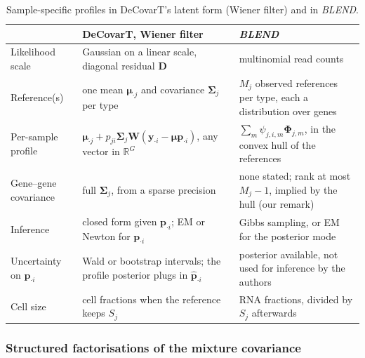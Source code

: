 \begin{table}[ht]
  \centering
  \small
  \caption{Sample-specific profiles in DeCovarT's latent form (Wiener filter) and in \emph{BLEND}.}
  \label{tab:wiener-blend}
  \begin{tabularx}{\textwidth}{@{}lYY@{}}
    \toprule
     & DeCovarT, Wiener filter & \emph{BLEND} \\
    \midrule
    Likelihood scale & Gaussian on a linear scale, diagonal residual \(\boldsymbol{D}\) & multinomial read counts \\
    Reference(s) & one mean \(\boldsymbol{\mu}_{\cdot j}\) and covariance \(\boldsymbol{\Sigma}_{j}\) per type & \(M_{j}\) observed references per type, each a distribution over genes \\
    Per-sample profile & \(\boldsymbol{\mu}_{\cdot j}+p_{ji}\boldsymbol{\Sigma}_{j}\boldsymbol{W}(\boldsymbol{y}_{\cdot i}-\boldsymbol{\mu}\boldsymbol{p}_{\cdot i})\), any vector in \(\mathbb{R}^{G}\) & \(\sum_{m}\psi_{j,i,m}\boldsymbol{\Phi}_{j,m}\), in the convex hull of the references \\
    Gene--gene covariance & full \(\boldsymbol{\Sigma}_{j}\), from a sparse precision & none stated; rank at most \(M_{j}-1\), implied by the hull (our remark) \\
    Inference & closed form given \(\boldsymbol{p}_{\cdot i}\); EM or Newton for \(\boldsymbol{p}_{\cdot i}\) & Gibbs sampling, or EM for the posterior mode \\
    Uncertainty on \(\boldsymbol{p}_{\cdot i}\) & Wald or bootstrap intervals; the profile posterior plugs in \(\hat{\boldsymbol{p}}_{\cdot i}\) & posterior available, not used for inference by the authors \\
    Cell size & cell fractions when the reference keeps \(S_{j}\) & RNA fractions, divided by \(S_{j}\) afterwards \\
    \bottomrule
  \end{tabularx}
\end{table}

\subsubsection{Structured factorisations of the mixture covariance}
\label{app:optim-structured}

